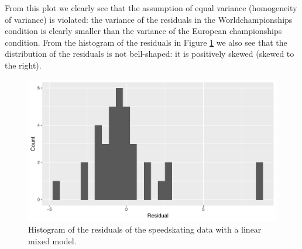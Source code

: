 \documentclass[]{book}\usepackage[]{graphicx}\usepackage[]{color}
\makeatletter
\def\maxwidth{ %
  \ifdim\Gin@nat@width>\linewidth
    \linewidth
  \else
    \Gin@nat@width
  \fi
}
\newenvironment{knitrout}{}{} %
\makeatother
\begin{document}
From this plot we clearly see that the assumption of equal variance (homogeneity of variance) is violated: the variance of the residuals in the Worldchampionships condition is clearly smaller than the variance of the European championships condition. From the histogram of the residuals in Figure \ref{fig:nonparmixed_3} we also see that the distribution of the residuals is not bell-shaped: it is positively skewed (skewed to the right).




\begin{knitrout}
\color{fgcolor}\begin{figure}

{\centering \includegraphics[width=\maxwidth]{figure/nonparmixed_3-1} 

}

\caption[Histogram of the residuals of the speedskating data with a linear mixed model]{Histogram of the residuals of the speedskating data with a linear mixed model.}\label{fig:nonparmixed_3}
\end{figure}


\end{knitrout}
\end{document}
